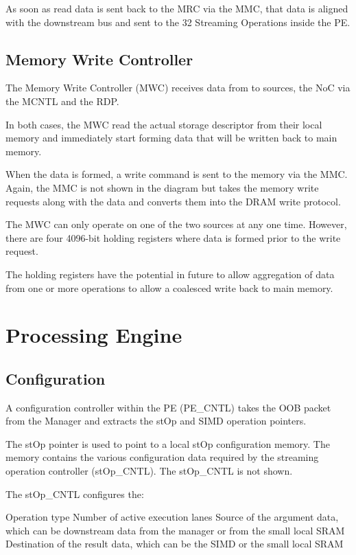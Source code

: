 As soon as read data is sent back to the MRC via the MMC, that data is aligned with the downstream bus and sent to the 32 Streaming Operations inside the PE.


\subsection{Memory Write Controller}
\label{sec:memoryWriteController}

The Memory Write Controller (MWC) receives data from to sources, the NoC via the MCNTL and the RDP.

In both cases, the MWC read the actual storage descriptor from their local memory and immediately start forming data that will be written back to main memory.

When the data is formed, a write command is sent to the memory via the MMC. Again, the MMC is not shown in the diagram but takes the memory write requests along with the data and converts them into the DRAM write protocol.

The MWC can only operate on one of the two sources at any one time. However, there are four 4096-bit holding registers where data is formed prior to the write request.

The holding registers have the potential in future to allow aggregation of data from one or more operations to allow a coalesced write back to main memory.


\section{Processing Engine}
\label{sec:pe}

\subsection{Configuration}
\label{sec:peConfiguration}

A configuration controller within the PE (PE\_CNTL) takes the OOB packet from the Manager and extracts the stOp and SIMD operation pointers.

The stOp pointer is used to point to a local stOp configuration memory. The memory contains the various configuration data required by the streaming operation controller (stOp\_CNTL). The stOp\_CNTL is not shown.

The stOp\_CNTL configures the:

\begin{outline}
    \1 Operation type
    \1 Number of active execution lanes
    \1 Source of the argument data, which can be downstream data from the manager or from the small local SRAM
    \1 Destination of the result data, which can be the SIMD or the small local SRAM
\end{outline}

